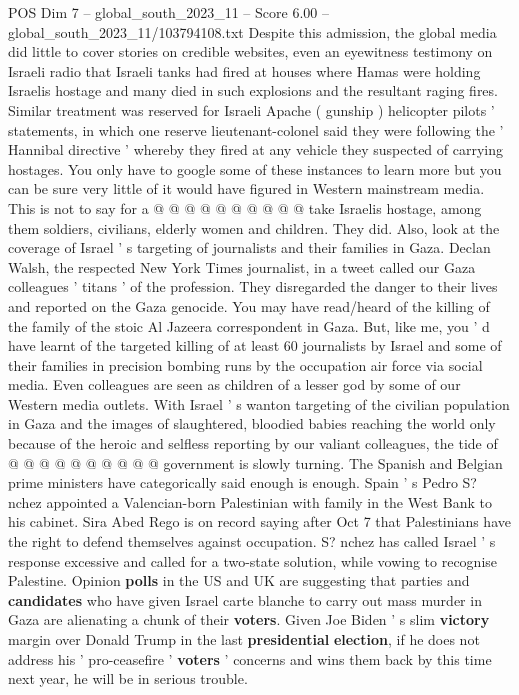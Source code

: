\begin{textsample}{POS Dim 7 – global\_south\_2023\_11 – Score 6.00 – global\_south\_2023\_11/103794108.txt}
Despite this admission, the global media did little to cover stories on credible websites, even an eyewitness testimony on Israeli radio that Israeli tanks had fired at houses where Hamas were holding Israelis hostage and many died in such explosions and the resultant raging fires.
Similar treatment was reserved for Israeli Apache ( gunship ) helicopter pilots ' statements, in which one reserve lieutenant-colonel said they were following the ' Hannibal directive ' whereby they fired at any vehicle they suspected of carrying hostages.
You only have to google some of these instances to learn more but you can be sure very little of it would have figured in Western mainstream media.
This is not to say for a @ @ @ @ @ @ @ @ @ @ take Israelis hostage, among them soldiers, civilians, elderly women and children.
They did.
Also, look at the coverage of Israel ' s targeting of journalists and their families in Gaza.
Declan Walsh, the respected New York Times journalist, in a tweet called our Gaza colleagues ' titans ' of the profession.
They disregarded the danger to their lives and reported on the Gaza genocide.
You may have read/heard of the killing of the family of the stoic Al Jazeera correspondent in Gaza.
But, like me, you ' d have learnt of the targeted killing of at least 60 journalists by Israel and some of their families in precision bombing runs by the occupation air force via social media.
Even colleagues are seen as children of a lesser god by some of our Western media outlets.
With Israel ' s wanton targeting of the civilian population in Gaza and the images of slaughtered, bloodied babies reaching the world only because of the heroic and selfless reporting by our valiant colleagues, the tide of @ @ @ @ @ @ @ @ @ @ government is slowly turning.
The Spanish and Belgian prime ministers have categorically said enough is enough.
Spain ' s Pedro S? nchez appointed a Valencian-born Palestinian with family in the West Bank to his cabinet.
Sira Abed Rego is on record saying after Oct 7 that Palestinians have the right to defend themselves against occupation.
S? nchez has called Israel ' s response excessive and called for a two-state solution, while vowing to recognise Palestine.
Opinion \textbf{polls} in the US and UK are suggesting that parties and \textbf{candidates} who have given Israel carte blanche to carry out mass murder in Gaza are alienating a chunk of their \textbf{voters}.
Given Joe Biden ' s slim \textbf{victory} margin over Donald Trump in the last \textbf{presidential} \textbf{election}, if he does not address his ' pro-ceasefire ' \textbf{voters} ' concerns and wins them back by this time next year, he will be in serious trouble.

\end{textsample}
